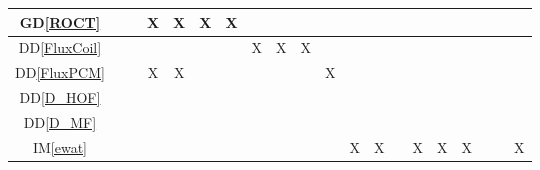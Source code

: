 \documentclass[12pt]{article}
\newcommand{\dref}[1]{GD\ref{#1}}
\newcommand{\ddref}[1]{DD\ref{#1}}
\newcommand{\iref}[1]{IM\ref{#1}}
\begin{document}
{\begin{landscape}
\begin{table}[h!]
\begin{tabular}{|c|c|c|c|c|c|c|c|c|c|c|c|c|c|c|c|c|c|c|c|}
                \dref{ROCT}         &                            &                 & X              & X             & X                      & X                &                    &                &                 &                   &                 &                   &                     &                  &                &                   &               &                    &                   \\ \hline
                \ddref{FluxCoil}    &                            &                 &                &               &                        &                  & X                  & X              & X               &                   &                 &                   &                     &                  &                &                   &               &                    &                   \\ \hline
                \ddref{FluxPCM}     &                            &                 & X              & X             &                        &                  &                    &                &                 & X                 &                 &                   &                     &                  &                &                   &               &                    &                   \\ \hline
                \ddref{D_HOF}       &                            &                 &                &               &                        &                  &                    &                &                 &                   &                 &                   &                     &                  &                &                   &               &                    &                   \\ \hline
                \ddref{D_MF}        &                            &                 &                &               &                        &                  &                    &                &                 &                   &                 &                   &                     &                  &                &                   &               &                    &                   \\ \hline
                \iref{ewat}         &                            &                 &                &               &                        &                  &                    &                &                 &                   & X               & X                 &                     & X                & X              & X                 &               &                    & X                 \\ \hline

\end{tabular}
\end{table}
\end{landscape}}
\end{document}

